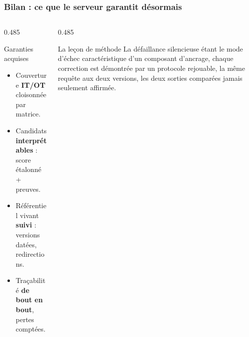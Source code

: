 \documentclass[aspectratio=169,11pt]{beamer}
\begin{document}
\begin{frame}
  \frametitle{Bilan : ce que le serveur garantit désormais}
  \vspace{0.1cm}
  \begin{columns}[T]
    \begin{column}{0.485\textwidth}
      \begin{exampleblock}{Garanties acquises}
        \footnotesize
        \begin{itemize}\setlength\itemsep{0.3em}
          \item Couverture \textbf{IT/OT} cloisonnée par matrice.
          \item Candidats \textbf{interprétables} : score étalonné + preuves.
          \item Référentiel vivant \textbf{suivi} : versions datées,
            redirections.
          \item Traçabilité \textbf{de bout en bout}, pertes comptées.
        \end{itemize}
      \end{exampleblock}
    \end{column}
    \begin{column}{0.485\textwidth}
      \begin{block}{La leçon de méthode}
        \footnotesize La défaillance silencieuse étant le mode d'échec
        caractéristique d'un composant d'ancrage, chaque correction est
        démontrée par un protocole rejouable, la même requête aux deux
        versions, les deux sorties comparées jamais seulement affirmée.
      \end{block}
    \end{column}
  \end{columns}
  \vspace{0.35cm}
  \begin{center}
  \end{center}
\end{frame}
 


\end{document}
